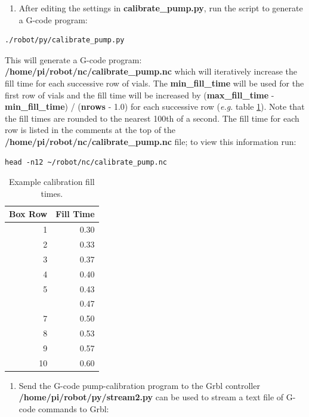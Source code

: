 \documentclass[
]{book}
\providecommand{\tightlist}{%
  \setlength{\itemsep}{0pt}\setlength{\parskip}{0pt}}
\begin{document}
\begin{enumerate}
\def\labelenumi{\arabic{enumi}.}
\setcounter{enumi}{2}
\tightlist
\item
  After editing the settings in \textbf{calibrate\_pump.py}, run the script to generate a G-code program:
\end{enumerate}

\begin{verbatim}
./robot/py/calibrate_pump.py
\end{verbatim}

This will generate a G-code program: \textbf{/home/pi/robot/nc/calibrate\_pump.nc} which will iteratively increase the fill time for each successive row of vials. The \textbf{min\_fill\_time} will be used for the first row of vials and the fill time will be increased by (\textbf{max\_fill\_time} - \textbf{min\_fill\_time}) / (\textbf{nrows} - 1.0) for each successive row (\emph{e.g.} table \ref{tab:calibrationFillTimes}). Note that the fill times are rounded to the nearest 100th of a second. The fill time for each row is listed in the comments at the top of the \textbf{/home/pi/robot/nc/calibrate\_pump.nc} file; to view this information run:

\begin{verbatim}
head -n12 ~/robot/nc/calibrate_pump.nc
\end{verbatim}

\begin{table}

\caption{\label{tab:calibrationFillTimes}Example calibration fill times.}
\centering
\begin{tabular}[t]{rr}
\toprule
Box Row & Fill Time\\
\midrule
1 & 0.30\\
2 & 0.33\\
3 & 0.37\\
4 & 0.40\\
5 & 0.43\\
\addlinespace
6 & 0.47\\
7 & 0.50\\
8 & 0.53\\
9 & 0.57\\
10 & 0.60\\
\bottomrule
\end{tabular}
\end{table}

\begin{enumerate}
\def\labelenumi{\arabic{enumi}.}
\setcounter{enumi}{3}
\tightlist
\item
  Send the G-code pump-calibration program to the Grbl controller
  \textbf{/home/pi/robot/py/stream2.py} can be used to stream a text file of G-code commands to Grbl:
\end{enumerate}
\end{document}
